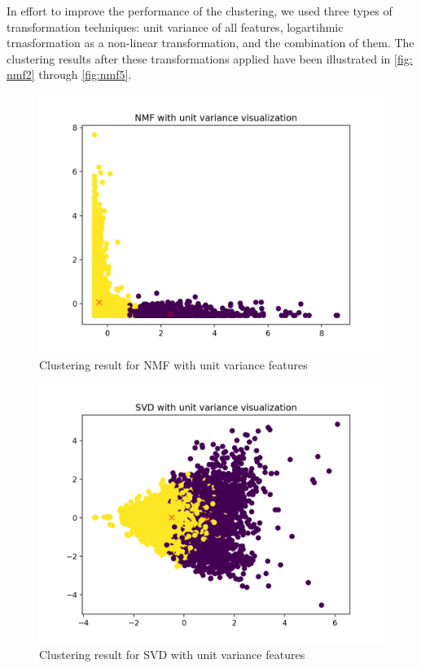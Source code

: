 \documentclass{report}
\begin{document}
In effort to improve the performance of the clustering, we used three types of transformation techniques: unit variance of all features, logartihmic trnasformation as a non-linear transformation, and the combination of them. The clustering results after these transformations applied have been illustrated in \ref{fig: nmf2} through \ref{fig:nmf5}.  

\begin{figure}
  \includegraphics[width=\linewidth]{nmf_unitvar_4b.png} 
  \vspace*{-20mm}
  \caption{Clustering result for NMF with unit variance features}
  \label{fig:nmf2}
\end{figure}

\begin{figure}
  \includegraphics[width=\linewidth]{svd_unitvar_4b.png} 
  \vspace*{-20mm}
  \caption{Clustering result for SVD with unit variance features}
  \label{fig:svd2}
\end{figure}
\end{document}
